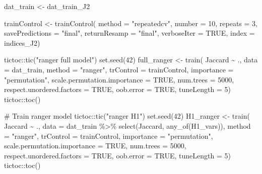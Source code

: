 \documentclass[
  letterpaper,
  DIV=11,
  numbers=noendperiod]{scrreprt}
\newenvironment{Shaded}{\begin{snugshade}}{\end{snugshade}}
\newcommand{\AttributeTok}[1]{\textcolor[rgb]{0.40,0.45,0.13}{#1}}
\newcommand{\CommentTok}[1]{\textcolor[rgb]{0.37,0.37,0.37}{#1}}
\newcommand{\ConstantTok}[1]{\textcolor[rgb]{0.56,0.35,0.01}{#1}}
\newcommand{\DecValTok}[1]{\textcolor[rgb]{0.68,0.00,0.00}{#1}}
\newcommand{\FunctionTok}[1]{\textcolor[rgb]{0.28,0.35,0.67}{#1}}
\newcommand{\NormalTok}[1]{\textcolor[rgb]{0.00,0.23,0.31}{#1}}
\newcommand{\OtherTok}[1]{\textcolor[rgb]{0.00,0.23,0.31}{#1}}
\newcommand{\SpecialCharTok}[1]{\textcolor[rgb]{0.37,0.37,0.37}{#1}}
\newcommand{\StringTok}[1]{\textcolor[rgb]{0.13,0.47,0.30}{#1}}
\begin{document}
\begin{Shaded}
\begin{Highlighting}[]
\NormalTok{dat\_train }\OtherTok{\textless{}{-}}\NormalTok{ dat\_train\_J2}

\NormalTok{trainControl }\OtherTok{\textless{}{-}} \FunctionTok{trainControl}\NormalTok{(}
    \AttributeTok{method =} \StringTok{"repeatedcv"}\NormalTok{,}
    \AttributeTok{number =} \DecValTok{10}\NormalTok{,}
    \AttributeTok{repeats =} \DecValTok{3}\NormalTok{,}
    \AttributeTok{savePredictions =} \StringTok{"final"}\NormalTok{,}
    \AttributeTok{returnResamp =} \StringTok{"final"}\NormalTok{,}
    \AttributeTok{verboseIter =} \ConstantTok{TRUE}\NormalTok{,}
    \AttributeTok{index =}\NormalTok{ indices\_J2)}

\NormalTok{tictoc}\SpecialCharTok{::}\FunctionTok{tic}\NormalTok{(}\StringTok{"ranger full model"}\NormalTok{)}
\FunctionTok{set.seed}\NormalTok{(}\DecValTok{42}\NormalTok{)}
\NormalTok{full\_ranger }\OtherTok{\textless{}{-}} \FunctionTok{train}\NormalTok{(}
\NormalTok{    Jaccard }\SpecialCharTok{\textasciitilde{}}\NormalTok{ .,}
    \AttributeTok{data =}\NormalTok{ dat\_train,}
    \AttributeTok{method =} \StringTok{"ranger"}\NormalTok{,}
    \AttributeTok{trControl =}\NormalTok{ trainControl,}
    \AttributeTok{importance =} \StringTok{"permutation"}\NormalTok{,}
    \AttributeTok{scale.permutation.importance =} \ConstantTok{TRUE}\NormalTok{,}
    \AttributeTok{num.trees =} \DecValTok{5000}\NormalTok{,}
    \AttributeTok{respect.unordered.factors =} \ConstantTok{TRUE}\NormalTok{,}
    \AttributeTok{oob.error =} \ConstantTok{TRUE}\NormalTok{,}
    \AttributeTok{tuneLength =} \DecValTok{5}\NormalTok{)}
\NormalTok{tictoc}\SpecialCharTok{::}\FunctionTok{toc}\NormalTok{()}


\CommentTok{\# Train ranger model}
\NormalTok{tictoc}\SpecialCharTok{::}\FunctionTok{tic}\NormalTok{(}\StringTok{"ranger H1"}\NormalTok{)}
\FunctionTok{set.seed}\NormalTok{(}\DecValTok{42}\NormalTok{)}
\NormalTok{H1\_ranger }\OtherTok{\textless{}{-}} \FunctionTok{train}\NormalTok{(}
\NormalTok{    Jaccard }\SpecialCharTok{\textasciitilde{}}\NormalTok{ .,}
    \AttributeTok{data =}\NormalTok{ dat\_train }\SpecialCharTok{\%\textgreater{}\%} \FunctionTok{select}\NormalTok{(Jaccard, }\FunctionTok{any\_of}\NormalTok{(H1\_vars)),}
    \AttributeTok{method =} \StringTok{"ranger"}\NormalTok{,}
    \AttributeTok{trControl =}\NormalTok{ trainControl,}
    \AttributeTok{importance =} \StringTok{"permutation"}\NormalTok{,}
    \AttributeTok{scale.permutation.importance =} \ConstantTok{TRUE}\NormalTok{,}
    \AttributeTok{num.trees =} \DecValTok{5000}\NormalTok{,}
    \AttributeTok{respect.unordered.factors =} \ConstantTok{TRUE}\NormalTok{,}
    \AttributeTok{oob.error =} \ConstantTok{TRUE}\NormalTok{,}
    \AttributeTok{tuneLength =} \DecValTok{5}\NormalTok{)}
\NormalTok{tictoc}\SpecialCharTok{::}\FunctionTok{toc}\NormalTok{()}



\end{Highlighting}
\end{Shaded}
\end{document}
